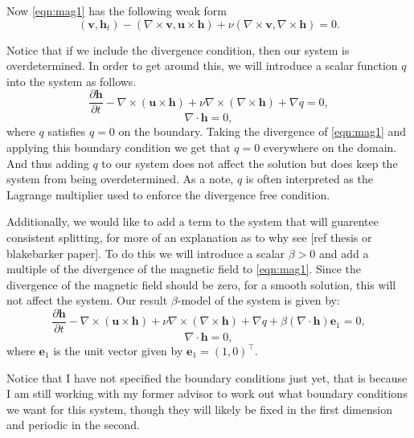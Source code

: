 \documentclass{article}
\begin{document}
Now \eqref{eqn:mag1} has the following weak form
\begin{equation}\label{eqn:mag1weak}
    (\boldsymbol{v}, \boldsymbol{h}_t)-(\nabla \times \boldsymbol{v},\boldsymbol{u}\times \boldsymbol{h}) + \nu (\nabla \times \boldsymbol{v},\nabla \times \boldsymbol{h}) = 0.
\end{equation}

Notice that if we include the divergence condition, then our system is overdetermined. In order to get around this, we will introduce a scalar function $q$ into the system as follows. 
\begin{equation}\label{eqn:mag1}
    \frac{\partial \boldsymbol{h} }{\partial t} - \nabla \times (\boldsymbol{u}\times \boldsymbol{h}) + \nu \nabla \times (\nabla \times \boldsymbol{h}) + \nabla q= 0,
\end{equation}
\begin{equation}\label{eqn:mag2}
    \nabla \cdot \boldsymbol{h} = 0,
\end{equation}
where $q$ satisfies $q = 0$ on the boundary. Taking the divergence of \eqref{eqn:mag1} and applying this boundary condition we get that $q=0$ everywhere on the domain. And thus adding $q$ to our system does not affect the solution but does keep the system from being overdetermined. As a note, $q$ is often interpreted as the Lagrange multiplier used to enforce the divergence free condition. 

Additionally, we would like to add a term to the system that will guarentee consistent splitting, for more of an explanation as to why see [ref thesis or blakebarker paper]. To do this we will introduce a scalar $\beta > 0$ and add a multiple of the divergence of the magnetic field to \eqref{eqn:mag1}. Since the divergence of the magnetic field should be zero, for a smooth solution, this will not affect the system. Our result $\beta$-model of the system is given by:
\begin{equation}\label{eqn:mag1}
    \frac{\partial \boldsymbol{h} }{\partial t} - \nabla \times (\boldsymbol{u}\times \boldsymbol{h}) + \nu \nabla \times (\nabla \times \boldsymbol{h}) + \nabla q + \beta (\nabla \cdot \boldsymbol{h})\boldsymbol{e}_1= 0,
\end{equation}
\begin{equation}\label{eqn:mag2}
    \nabla \cdot \boldsymbol{h} = 0,
\end{equation}
where $\boldsymbol{e}_1$ is the unit vector given by $\boldsymbol{e}_1 = (1, 0)^\top$. 

Notice that I have not specified the boundary conditions just yet, that is because I am still working with my former advisor to work out what boundary conditions we want for this system, though they will likely be fixed in the first dimension and periodic in the second. 
\end{document}
